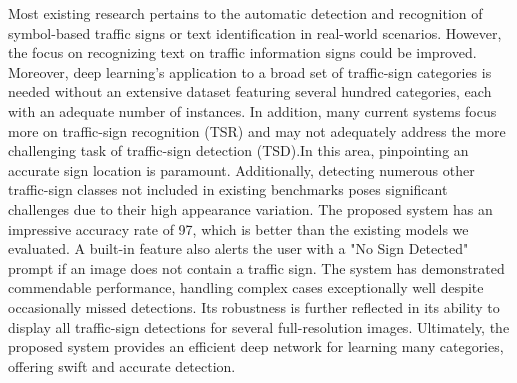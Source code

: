 \documentclass[conference]{IEEEtran}
\begin{document}
Most existing research pertains to the automatic detection and recognition of symbol-based traffic signs or text identification in real-world scenarios. However, the focus on recognizing text on traffic information signs could be improved. Moreover, deep learning's application to a broad set of traffic-sign categories is needed without an extensive dataset featuring several hundred categories, each with an adequate number of instances. In addition, many current systems focus more on traffic-sign recognition (TSR) and may not adequately address the more challenging task of traffic-sign detection (TSD).In this area, pinpointing an accurate sign location is paramount. Additionally, detecting numerous other traffic-sign classes not included in existing benchmarks poses significant challenges due to their high appearance variation.
The proposed system has an impressive accuracy rate of 97, which is better than the existing models we evaluated. A built-in feature also alerts the user with a "No Sign Detected" prompt if an image does not contain a traffic sign. The system has demonstrated commendable performance, handling complex cases exceptionally well despite occasionally missed detections. Its robustness is further reflected in its ability to display all traffic-sign detections for several full-resolution images. Ultimately, the proposed system provides an efficient deep network for learning many categories, offering swift and accurate detection. 
\end{document}
